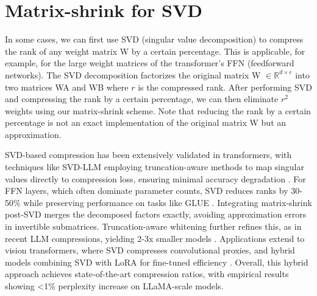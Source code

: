 \documentclass{article}
\begin{document}
\section{Matrix-shrink for SVD}
In some cases, we can first use SVD (singular value decomposition) to compress the rank of any weight matrix W by a certain percentage. This is applicable, for example, for the large weight matrices of the transformer’s FFN (feedforward networks). The SVD decomposition factorizes the original matrix W $\in \mathbb{R}^{d \times e}$ into two matrices WA and WB where $r$ is the compressed rank. After performing SVD and compressing the rank by a certain percentage, we can then eliminate $r^{2}$ weights using our matrix-shrink scheme. Note that reducing the rank by a certain percentage is not an exact implementation of the original matrix W but an approximation.

SVD-based compression has been extensively validated in transformers, with techniques like SVD-LLM employing truncation-aware methods to map singular values directly to compression loss, ensuring minimal accuracy degradation \cite{github2024svdllm}. For FFN layers, which often dominate parameter counts, SVD reduces ranks by 30-50\% while preserving performance on tasks like GLUE \cite{lesswrong2022svd}. Integrating matrix-shrink post-SVD merges the decomposed factors exactly, avoiding approximation errors in invertible submatrices. Truncation-aware whitening further refines this, as in recent LLM compressions, yielding 2-3x smaller models \cite{openreview2024svdllm}. Applications extend to vision transformers, where SVD compresses convolutional proxies, and hybrid models combining SVD with LoRA for fine-tuned efficiency \cite{cvpr2024pela}. Overall, this hybrid approach achieves state-of-the-art compression ratios, with empirical results showing <1\% perplexity increase on LLaMA-scale models.



\end{document}
